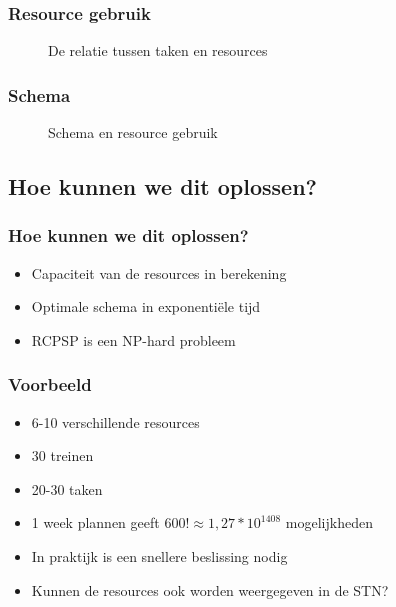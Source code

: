 \documentclass{beamer}
\theoremstyle{definition}
\newcommand{\inputtikz}[1]{}
\begin{document}
\begin{frame}
	\frametitle{Resource gebruik}
	\vspace{-.2em}
	\begin{figure}[ht]
		\makebox[\textwidth][c]{\resizebox{.7\paperwidth}{!}{
			\inputtikz{usage_nl}
		}}
		\vspace{-1em}
		\caption{De relatie tussen taken en resources}
		\label{fig:activity_graph}
	\end{figure}
\end{frame}

\begin{frame}
\frametitle{Schema}
	\vspace{-1.2em}
	\begin{figure}[ht]
		\makebox[\textwidth][c]{\resizebox{.36\paperwidth}{!}{
			\inputtikz{schedule_infeasible_colored_profile}
		}}
		\vspace{-1.3em}
		\caption{Schema en resource gebruik}
	\end{figure}
\end{frame}

\subsection{Hoe kunnen we dit oplossen?}
\begin{frame}
	\frametitle{Hoe kunnen we dit oplossen?}
	\begin{itemize}
		\item Capaciteit van de resources in berekening
		\item Optimale schema in exponenti\"{e}le tijd
		\item RCPSP is een NP-hard probleem
	\end{itemize}
\end{frame}

\begin{frame}
	\frametitle{Voorbeeld}
	\begin{itemize}
		\item 6-10 verschillende resources
		\item 30 treinen
		\item 20-30 taken
		\item<2-> 1 week plannen geeft \textbf{$600! \approx 1,27 * 10^{1408}$} mogelijkheden
		\item<3-> In praktijk is een snellere beslissing nodig
		\item<3-> Kunnen de resources ook worden weergegeven in de STN?
	\end{itemize}
\end{frame}
\end{document}
